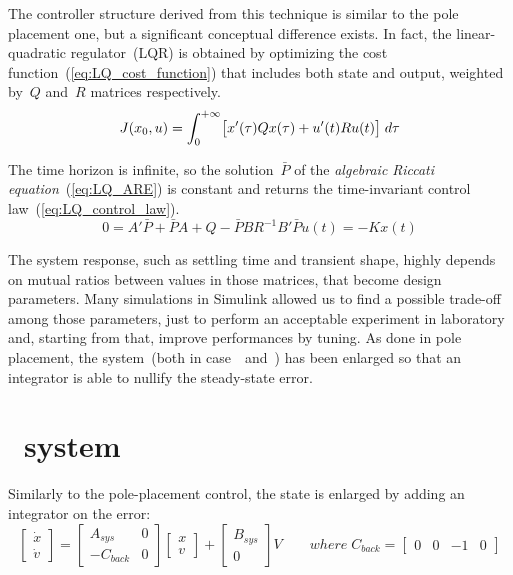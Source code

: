 
The controller structure derived from this technique is similar to the pole placement one, but a significant conceptual difference exists. In fact, the linear-quadratic regulator~(LQR) is obtained by optimizing the cost function~(\cref{eq:LQ_cost_function}) that includes both state and output, weighted by~$Q$ and~$R$ matrices respectively.
\[
	J(x_0, u) = \int_{0}^{+\infty} \bigl{[} x'(\tau)Qx(\tau) + u'(t)Ru(t) \bigr{]} \; d\tau
	\label{eq:LQ_cost_function}
\]

The time horizon is infinite, so the solution~$\bar{P}$ of the \textit{algebraic Riccati equation}~(\cref{eq:LQ_ARE}) is constant and returns the time-invariant control law~(\ref{eq:LQ_control_law}).
\begin{subequations}
	\begin{equation}
		0 = A' \bar{P} + \bar{P} A + Q - \bar{P} B R^{-1} B' \bar{P}
		\label{eq:LQ_ARE}
	\end{equation}
	\begin{equation}
		u(t) = -K x(t)
		\label{eq:LQ_control_law}
	\end{equation}
\end{subequations}

The system response, such as settling time and transient shape, highly depends on mutual ratios between values in those matrices, that become design parameters. Many simulations in Simulink allowed us to find a possible trade-off among those parameters, just to perform an acceptable experiment in laboratory and, starting from that, improve performances by tuning.
As done in pole placement, the system~(both in case~\onedof\ and~\twodof) has been enlarged so that an integrator is able to nullify the steady-state error.

\section{\onedof\ system}

Similarly to the pole-placement control, the state is enlarged by adding an integrator on the error:
\begin{equation}
	\begin{bmatrix}
		\dot{x} \\
		\dot{v}
	\end{bmatrix}
	=
	\begin{bmatrix}
		A_{sys} & 0 \\
		-C_{back} & 0
	\end{bmatrix}
	\begin{bmatrix}
		x \\
		v
	\end{bmatrix}
	+
	\begin{bmatrix}
		B_{sys} \\
		0
	\end{bmatrix}
	V
	\qquad
	where \; C_{back} =
	\begin{bmatrix}
		0 & 0 & -1 & 0
	\end{bmatrix}
\end{equation}

